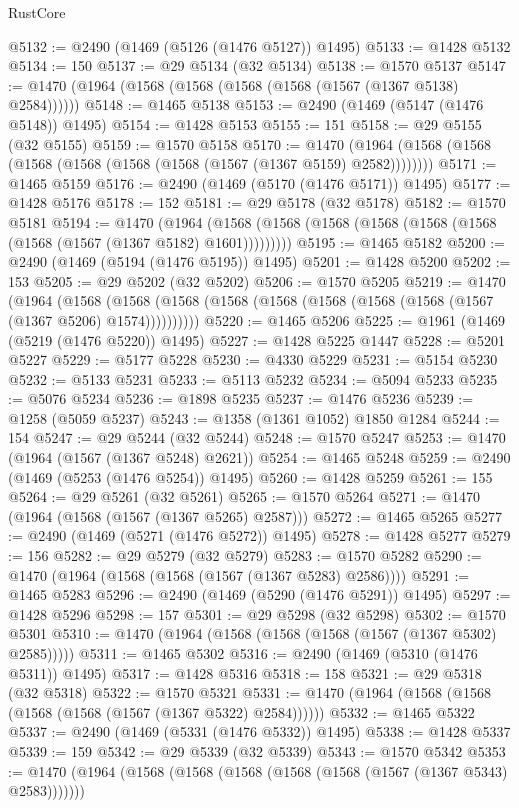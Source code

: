 \begin{lexlean}{RustCore}
\begin{coremodule}
@5132 := @2490 (@1469 (@5126 (@1476 @5127)) @1495)
@5133 := @1428 @5132
@5134 := 150
@5137 := @29 @5134 (@32 @5134)
@5138 := @1570 @5137
@5147 := @1470 (@1964 (@1568 (@1568 (@1568 (@1568 (@1567 (@1367 @5138) @2584))))))
@5148 := @1465 @5138
@5153 := @2490 (@1469 (@5147 (@1476 @5148)) @1495)
@5154 := @1428 @5153
@5155 := 151
@5158 := @29 @5155 (@32 @5155)
@5159 := @1570 @5158
@5170 := @1470 (@1964 (@1568 (@1568 (@1568 (@1568 (@1568 (@1568 (@1567 (@1367 @5159) @2582))))))))
@5171 := @1465 @5159
@5176 := @2490 (@1469 (@5170 (@1476 @5171)) @1495)
@5177 := @1428 @5176
@5178 := 152
@5181 := @29 @5178 (@32 @5178)
@5182 := @1570 @5181
@5194 := @1470
    (@1964 (@1568 (@1568 (@1568 (@1568 (@1568 (@1568 (@1568 (@1567 (@1367 @5182) @1601)))))))))
@5195 := @1465 @5182
@5200 := @2490 (@1469 (@5194 (@1476 @5195)) @1495)
@5201 := @1428 @5200
@5202 := 153
@5205 := @29 @5202 (@32 @5202)
@5206 := @1570 @5205
@5219 := @1470
    (@1964
      (@1568 (@1568 (@1568 (@1568 (@1568 (@1568 (@1568 (@1568 (@1567 (@1367 @5206) @1574))))))))))
@5220 := @1465 @5206
@5225 := @1961 (@1469 (@5219 (@1476 @5220)) @1495)
@5227 := @1428 @5225 @1447
@5228 := @5201 @5227
@5229 := @5177 @5228
@5230 := @4330 @5229
@5231 := @5154 @5230
@5232 := @5133 @5231
@5233 := @5113 @5232
@5234 := @5094 @5233
@5235 := @5076 @5234
@5236 := @1898 @5235
@5237 := @1476 @5236
@5239 := @1258 (@5059 @5237)
@5243 := @1358 (@1361 @1052) @1850 @1284
@5244 := 154
@5247 := @29 @5244 (@32 @5244)
@5248 := @1570 @5247
@5253 := @1470 (@1964 (@1567 (@1367 @5248) @2621))
@5254 := @1465 @5248
@5259 := @2490 (@1469 (@5253 (@1476 @5254)) @1495)
@5260 := @1428 @5259
@5261 := 155
@5264 := @29 @5261 (@32 @5261)
@5265 := @1570 @5264
@5271 := @1470 (@1964 (@1568 (@1567 (@1367 @5265) @2587)))
@5272 := @1465 @5265
@5277 := @2490 (@1469 (@5271 (@1476 @5272)) @1495)
@5278 := @1428 @5277
@5279 := 156
@5282 := @29 @5279 (@32 @5279)
@5283 := @1570 @5282
@5290 := @1470 (@1964 (@1568 (@1568 (@1567 (@1367 @5283) @2586))))
@5291 := @1465 @5283
@5296 := @2490 (@1469 (@5290 (@1476 @5291)) @1495)
@5297 := @1428 @5296
@5298 := 157
@5301 := @29 @5298 (@32 @5298)
@5302 := @1570 @5301
@5310 := @1470 (@1964 (@1568 (@1568 (@1568 (@1567 (@1367 @5302) @2585)))))
@5311 := @1465 @5302
@5316 := @2490 (@1469 (@5310 (@1476 @5311)) @1495)
@5317 := @1428 @5316
@5318 := 158
@5321 := @29 @5318 (@32 @5318)
@5322 := @1570 @5321
@5331 := @1470 (@1964 (@1568 (@1568 (@1568 (@1568 (@1567 (@1367 @5322) @2584))))))
@5332 := @1465 @5322
@5337 := @2490 (@1469 (@5331 (@1476 @5332)) @1495)
@5338 := @1428 @5337
@5339 := 159
@5342 := @29 @5339 (@32 @5339)
@5343 := @1570 @5342
@5353 := @1470 (@1964 (@1568 (@1568 (@1568 (@1568 (@1568 (@1567 (@1367 @5343) @2583)))))))

\end{coremodule}
\end{lexlean}

